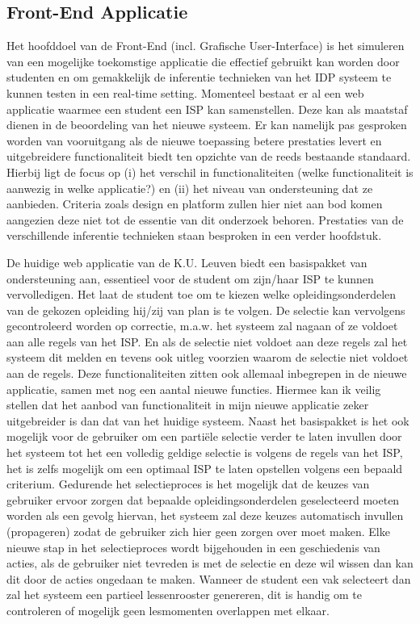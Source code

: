 \subsection{Front-End Applicatie} 
Het hoofddoel van de Front-End (incl. Grafische User-Interface) is het simuleren van een mogelijke toekomstige applicatie die effectief gebruikt kan worden door studenten en om gemakkelijk de inferentie technieken van het IDP systeem te kunnen testen in een real-time setting. Momenteel bestaat er al een web applicatie waarmee een student een ISP kan samenstellen. Deze kan als maatstaf dienen in de beoordeling van het nieuwe systeem. Er kan namelijk pas gesproken worden van vooruitgang als de nieuwe toepassing betere prestaties levert en uitgebreidere functionaliteit biedt ten opzichte van de reeds bestaande standaard. Hierbij ligt de focus op (i) het verschil in functionaliteiten (welke functionaliteit is aanwezig in welke applicatie?) en (ii) het niveau van ondersteuning dat ze aanbieden. Criteria zoals design en platform zullen hier niet aan bod komen aangezien deze niet tot de essentie van dit onderzoek behoren. Prestaties van de verschillende inferentie technieken staan besproken in een verder hoofdstuk. 

De huidige web applicatie van de K.U. Leuven biedt een basispakket van ondersteuning aan, essentieel voor de student om zijn/haar ISP te kunnen vervolledigen. Het laat de student toe om te kiezen welke opleidingsonderdelen van de gekozen opleiding hij/zij van plan is te volgen. De selectie kan vervolgens gecontroleerd worden op correctie, m.a.w. het systeem zal nagaan of ze voldoet aan alle regels van het ISP. En als de selectie niet voldoet aan deze regels zal het systeem dit melden en tevens ook uitleg voorzien waarom de selectie niet voldoet aan de regels. Deze functionaliteiten zitten ook allemaal inbegrepen in de nieuwe applicatie, samen met nog een aantal nieuwe functies. Hiermee kan ik veilig stellen dat het aanbod van functionaliteit in mijn nieuwe applicatie zeker uitgebreider is dan dat van het huidige systeem. 
Naast het basispakket is het ook mogelijk voor de gebruiker om een parti\"{e}le selectie verder te laten invullen door het systeem tot het een volledig geldige selectie is volgens de regels van het ISP, het is zelfs mogelijk om een optimaal ISP te laten opstellen volgens een bepaald criterium. Gedurende het selectieproces is het mogelijk dat de keuzes van gebruiker ervoor zorgen dat bepaalde opleidingsonderdelen geselecteerd moeten worden als een gevolg hiervan, het systeem zal deze keuzes automatisch invullen (propageren) zodat de gebruiker zich hier geen zorgen over moet maken. Elke nieuwe stap in het selectieproces wordt bijgehouden in een geschiedenis van acties, als de gebruiker niet tevreden is met de selectie en deze wil wissen dan kan dit door de acties ongedaan te maken. Wanneer de student een vak selecteert dan zal het systeem een partieel lessenrooster genereren, dit is handig om te controleren of mogelijk geen lesmomenten overlappen met elkaar. 

